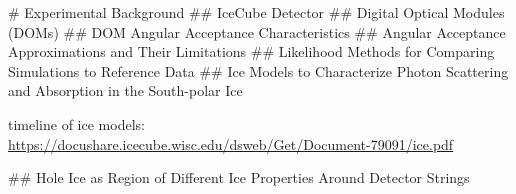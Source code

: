 
# Experimental Background
## IceCube Detector
## Digital Optical Modules (DOMs)
## DOM Angular Acceptance Characteristics
## Angular Acceptance Approximations and Their Limitations
## Likelihood Methods for Comparing Simulations to Reference Data
## Ice Models to Characterize Photon Scattering and Absorption in the South-polar Ice

timeline of ice models: \url{https://docushare.icecube.wisc.edu/dsweb/Get/Document-79091/ice.pdf} \cite{flasherdataderivedicemodels}

## Hole Ice as Region of Different Ice Properties Around Detector Strings
